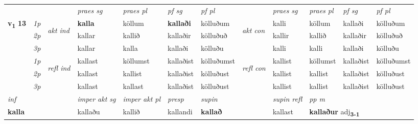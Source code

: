 \begin{longtable}[l]{X>{\footnotesize\itshape}llXXXXlXXXX}
 & &   & \textit{praes sg}  & \textit{praes pl}    & \textit{ pf sg} & \textit{pf pl} & & \textit{praes sg}  & \textit{praes pl}    & \textit{pf sg} & \textit{pf pl }  \\ \cmidrule{4-7} \cmidrule{9-12}
 \multirow{2}{*}{{{\textbf{v{\textsubscript{1}}} \Large{\textbf{13}}}}}  & 1p & \multirow{3}{*}{\begin{turn}{90}\textit{akt ind}\end{turn}} & \textbf{kalla} & köllum & \textbf{kallaði} & kölluðum & \multirow{3}{*}{\begin{turn}{90}\textit{akt con}\end{turn}} &kalli & köllum & kallaði & kölluðum\\*
 & 2p &  &  kallar  & kallið & kallaðir & kölluðuð & & kallir & kallið & kallaðir & kölluðuð \\*
 & 3p &  & kallar & kalla & kallaði & kölluðu & & kalli & kalli& kallaði & kölluðu \\*
\cmidrule{4-7} \cmidrule{9-12}
 & 1p & \multirow{3}{*}{\begin{turn}{90}\textit{refl ind}\end{turn}}  & kallast & köllumst & kallaðist & kölluðumst & \multirow{3}{*}{\begin{turn}{90}\textit{refl con}\end{turn}}  &kallist & köllumst & kallaðist & kölluðumst \\*
 & 2p &  & kallast & kallist & kallaðist & kölluðust & &kallist & kallist & kallaðist & kölluðust \\*
 & 3p  & & kallast & kallast & kallaðist & kölluðust & & kallist & kallist& kallaðist & kölluðust \\*
\cmidrule{4-7} \cmidrule{9-12}

   {\textit{inf}} & &  & \textit{imper akt sg} & \textit{imper akt pl}   & \textit{presp} & \textit{supin} && \textit{supin refl} & \textit{pp m} \\*
  {\textbf{kalla}} & && kallaðu  & kallið   & kallandi &  \textbf{kallað} && kallast & \multicolumn{2}{l}{\textbf{kallaður} adj\textbf{\textsubscript{3-1}}} \\*

\midrule


\end{longtable}
